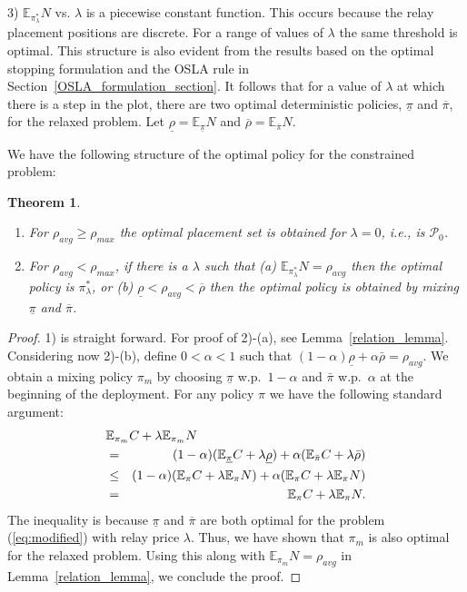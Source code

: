 \documentclass[conference]{IEEEtran}
\newtheorem{theorem}{Theorem}
\begin{document}
3) $\mathbb{E}_{\pi_{\lambda}^*} N$ vs. $\lambda$ is a piecewise constant function. This occurs 
because the relay placement positions are discrete. For a range of values of $\lambda$ the 
same threshold is optimal. This structure is also evident from the results based on the 
optimal stopping formulation and the OSLA rule in Section~\ref{OSLA_formulation_section}. It 
follows that for a value of $\lambda$ at which there is a step in the plot, there are two 
optimal deterministic policies, $\underline{\pi}$ and $\overline{\pi}$, for the relaxed 
problem. Let $\underline{\rho}=\mathbb{E}_{\underline{\pi}} N$ and 
$\overline{\rho}=\mathbb{E}_{\overline{\pi}} N$.


We have the following structure of the optimal policy for the constrained problem:
\begin{theorem}
\label{constrained_solution_theorem}
\begin{enumerate}
	\item For $\rho_{avg} \geq \rho_{max}$ the optimal placement set is obtained for $\lambda=0$,
 i.e., is $\mathcal{P}_0$.
	 \item For $\rho_{avg} < \rho_{max}$, if there is a $\lambda$ such that (a) 
$\mathbb{E}_{\pi_{\lambda}^*} N=\rho_{avg}$ then the optimal policy is $\pi_{\lambda}^*$, or 
(b) $\underline{\rho}<\rho_{avg}<\overline{\rho}$ then the optimal policy is obtained by 
mixing $\underline{\pi}$ and $\overline{\pi}$.
\end{enumerate}
\end{theorem}
\begin{proof}
  1) is straight forward. For proof of 2)-(a), see
  Lemma~\ref{relation_lemma}. Considering now 2)-(b), define
  $0<\alpha<1$ such that
  $(1-\alpha)\underline{\rho}+\alpha\bar{\rho}=\rho_{avg}$.  We obtain
  a mixing policy $\pi_{m}$ by choosing $\underline{\pi}$ w.p.\
  $1-\alpha$ and $\bar{\pi}$ w.p.\ $\alpha$ at the beginning of the
  deployment. For any policy $\pi$ we have the following standard
  argument:
\begin{eqnarray}
\lefteqn{\mathbb{E}_{\pi_m}C+\lambda\mathbb{E}_{\pi_m}N}\nonumber\\
&=&(1-\alpha)
(\mathbb{E}_{\underline{\pi}}C+\lambda\underline{\rho})+\alpha(\mathbb{E}_{\bar{\pi}}C
+\lambda\bar{\rho})\nonumber\\
&\le& (1-\alpha)
(\mathbb{E}_{\pi}C+\lambda\mathbb{E}_{\pi}N)+\alpha(\mathbb{E}_{{\pi}}C+\lambda
\mathbb{E}_{\pi}N)\nonumber\\
&=&\mathbb{E}_{{\pi}}C+\lambda\mathbb{E}_{\pi}N.
\end{eqnarray}
The inequality is because $\underline{\pi}$ and $\overline{\pi}$ are both optimal for the 
problem (\ref{eq:modified}) with relay price $\lambda$.
Thus, we have shown that $\pi_m$ is also optimal for the relaxed problem. Using this along 
with $\mathbb{E}_{\pi_m}N=\rho_{avg}$ in Lemma~\ref{relation_lemma}, we conclude the proof.
\end{proof}
\end{document}
